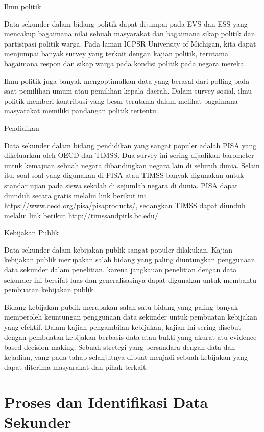 \documentclass[
]{book}
\begin{document}
Ilmu politik

Data sekunder dalam bidang politik dapat dijumpai pada EVS dan ESS yang mencakup bagaimana nilai sebuah masyarakat dan bagaimana sikap politik dan partisipasi politik warga. Pada laman ICPSR University of Michigan, kita dapat menjumpai banyak survey yang terkait dengan kajian politik, terutama bagaimana respon dan sikap warga pada kondisi politik pada negara mereka.

Ilmu politik juga banyak mengoptimalkan data yang berasal dari polling pada saat pemilihan umum atau pemilihan kepala daerah. Dalam survey sosial, ilmu politik memberi kontribusi yang besar terutama dalam melihat bagaimana masyarakat memiliki pandangan politik tertentu.

Pendidikan

Data sekunder dalam bidang pendidikan yang sangat populer adalah PISA yang dikeluarkan oleh OECD dan TIMSS. Dua survey ini sering dijadikan barometer untuk kemajuan sebuah negara dibandingkan negara lain di seluruh dunia. Selain itu, soal-soal yang digunakan di PISA atau TIMSS banyak digunakan untuk standar ujian pada siswa sekolah di sejumlah negara di dunia. PISA dapat diunduh secara gratis melalui link berikut ini \url{https://www.oecd.org/pisa/pisaproducts/}, sedangkan TIMSS dapat diunduh melalui link berikut \url{http://timssandpirls.bc.edu/}.

Kebijakan Publik

Data sekunder dalam kebijakan publik sangat populer dilakukan. Kajian kebijakan publik merupakan salah bidang yang paling diuntungkan penggunaan data sekunder dalam penelitian, karena jangkauan penelitian dengan data sekunder ini bersifat luas dan generalisasinya dapat digunakan untuk membantu pembuatan kebijakan publik.

Bidang kebijakan publik merupakan salah satu bidang yang paling banyak memperoleh keuntungan penggunaan data sekunder untuk pembuatan kebijakan yang efektif. Dalam kajian pengambilan kebijakan, kajian ini sering disebut dengan pembuatan kebijakan berbasis data atau bukti yang akurat atu evidence-based decision making. Sebuah stretegi yang bersandara dengan data dan kejadian, yang pada tahap selanjutnya dibuat menjadi sebuah kebijakan yang dapat diterima masyarakat dan pihak terkait.

\hypertarget{proses-dan-identifikasi-data-sekunder}{%
\chapter{Proses dan Identifikasi Data Sekunder}\label{proses-dan-identifikasi-data-sekunder}}
\end{document}
